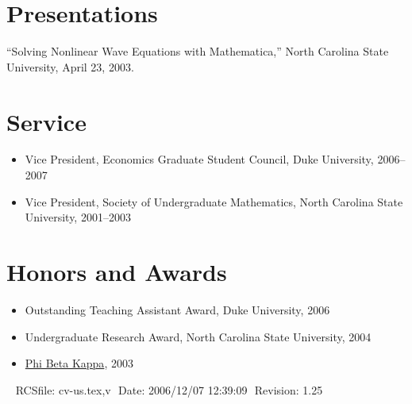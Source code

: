 \documentclass[overlapped,line,letterpaper]{res}
\def\Cplusplus{{\rm C\raise.5ex\hbox{\small ++}}}
\begin{document}
\begin{resume}

\section{\bf Presentations}

``Solving Nonlinear Wave Equations with Mathematica,''
North Carolina State University, April 23, 2003.


\section{\bf Service}

\begin{itemize}
\item Vice President, Economics Graduate Student Council, Duke
  University, 2006--2007
\item Vice President, Society of Undergraduate Mathematics, North
  Carolina State University, 2001--2003
\end{itemize}


\section{\bf Honors and Awards}
\begin{itemize}
\item Outstanding Teaching Assistant Award, Duke University, 2006
\item Undergraduate Research Award, North Carolina State University, 2004
\item \href{http://www.pbk.org/}{Phi Beta Kappa}, 2003
\end{itemize}




\begin{center}
\vspace{\fill}\ \newline
{\tiny \rm $ $RCSfile: cv-us.tex,v $ $ }
{\tiny \rm $ $Date: 2006/12/07 12:39:09 $ $ }
{\tiny \rm $ $Revision: 1.25 $ $ }
\end{center}

\end{resume}
\end{document}
